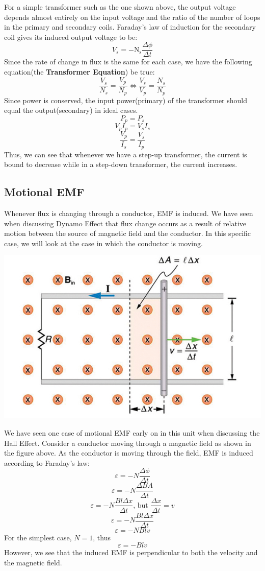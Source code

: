\documentclass[11pt]{article}
\begin{document}
	For a simple transformer such as the one shown above, the output voltage depends almost entirely on the input voltage and the ratio of the number of loops in the primary and secondary coils. Faraday’s law of induction for the secondary coil gives its induced output voltage to be:
	$$V_s=-\text{N}_\text{s}\dfrac{\Delta\phi}{\Delta t}$$
	Since the rate of change in flux is the same for each case, we have the following equation(the \textbf{Transformer Equation}) be true:
	$$\dfrac{V_s}{N_s}=\dfrac{V_p}{N_p}\iff\dfrac{V_s}{V_p}=\dfrac{N_s}{N_p}$$
	Since power is conserved, the input power(primary) of the transformer should equal the output(secondary) in ideal cases.
	$$P_{p}=P_{s}$$
	$$V_pI_p=V_sI_s$$
	$$\dfrac{V_p}{I_s}=\dfrac{V_s}{I_p}$$
	Thus, we can see that whenever we have a step-up transformer, the current is bound to decrease while in a step-down transformer, the current increases.
	\subsection*{Motional EMF}
	Whenever flux is changing through a conductor, EMF is induced. We have seen when discussing Dynamo Effect that flux change occurs as a result of relative motion between the source of magnetic field and the conductor. In this specific case, we will look at the case in which the conductor is moving.
	\begin{center}
		\includegraphics[scale=0.5]{motional_EMF}
	\end{center}
	We have seen one case of motional EMF early on in this unit when discussing the Hall Effect. Consider a conductor moving through a magnetic field as shown in the figure above. As the conductor is moving through the field, EMF is induced according to Faraday's law:
	$$\varepsilon=-N\dfrac{\Delta\phi}{\varDelta t}$$
	$$\varepsilon=-N\dfrac{\Delta BA}{\varDelta t}$$
	$$\varepsilon=-N\dfrac{ Bl\Delta x}{\Delta t}\text{, but }\dfrac{\Delta x}{\Delta t}=v$$
	$$\varepsilon=-N\dfrac{ Bl\Delta x}{\Delta t}$$
	$$\varepsilon=-NBlv$$
	For the simplest case, $N=1$, thus
	$$\varepsilon=-Blv$$
	However, we see that the induced EMF is perpendicular to both the velocity and the magnetic field.
\end{document}
